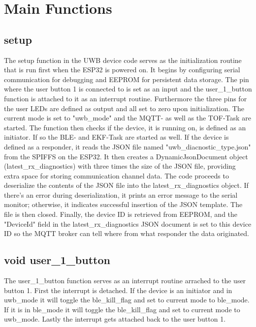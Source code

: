 \section{Main Functions}
\label{sec:Main_Functions}

\subsection{setup}
\label{subsec:setup}
The setup function in the UWB device code serves as the initialization routine that is run first when the ESP32 is powered on. 
It begins by configuring serial communication for debugging and EEPROM for persistent data storage. 
The pin where the user button 1 is connected to is set as an input and the user\_1\_button function is attached to it as an interrupt routine. 
Furthermore the three pins for the user LEDs are defined as output and all set to zero upon initialization. 
The current mode is set to "uwb\_mode" and the MQTT- as well as the TOF-Task are started. 
\vspace{4pt}
\newline
The function then checks if the device, it is running on, is defined as an initiator. 
If so the BLE- and EKF-Task are started as well. 
\vspace{4pt}
\newline
If the device is defined as a responder, it reads the JSON file named 
\newline
"uwb\_diacnostic\_type.json" from the SPIFFS on the ESP32.
It then creates a DynamicJsonDocument object (latest\_rx\_diagnostics) with three times the size of the JSON file, providing extra space for storing communication channel data.
The code proceeds to deserialize the contents of the JSON file into the latest\_rx\_diagnostics object. If there's an error during deserialization, it prints an error message to the serial monitor; otherwise, it indicates successful insertion of the JSON template. The file is then closed. Finally, the device ID is retrieved from EEPROM, and the "DeviceId" field in the latest\_rx\_diagnostics JSON document is set to this device ID so the MQTT broker can tell where from what responder the data originated. 

\subsection{void user\_1\_button}
\label{subsec:user_1_button}
The user\_1\_button function serves as an interrupt routine arrached to the user button 1. 
First the interrupt is detached. 
If the device is an initiator and in uwb\_mode it will toggle the ble\_kill\_flag and set to current mode to ble\_mode. 
If it is in ble\_mode it will toggle the ble\_kill\_flag and set to current mode to uwb\_mode. 
Lastly the interrupt gets attached back to the user button 1. 

